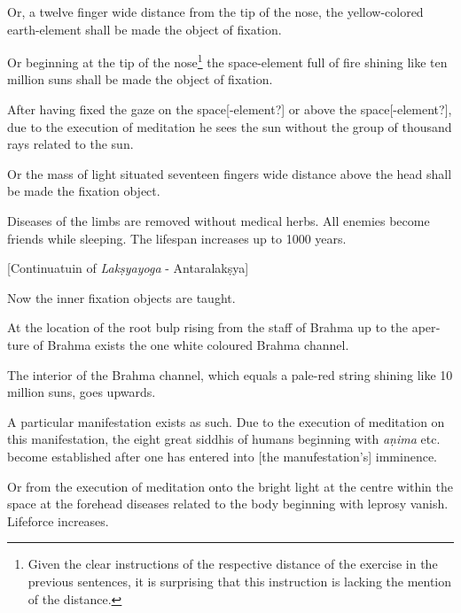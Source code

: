 \begin{otherlanguage}{english}
\begin{tlate}
\end{tlate}
\begin{tlate}
Or, a twelve finger wide distance from the tip of the nose, the yellow-colored earth-element shall be made the object of fixation. 
\end{tlate}
\begin{tlate}
Or beginning at the tip of the nose\footnote{Given the clear instructions of the respective distance of the exercise in the previous sentences, it is surprising that this instruction is lacking the mention of the distance.} the space-element full of fire shining like ten million suns shall be made the object of fixation.
\end{tlate}
\begin{tlate}
After having fixed the gaze on the space[-element?] or above the space[-element?], due to the execution of meditation he sees the sun without the group of thousand rays related to the sun. 
\end{tlate}
\begin{tlate}
Or the mass of light situated seventeen fingers wide distance above the head shall be made the fixation object.
\end{tlate}
\begin{tlate}
Diseases of the limbs are removed without medical herbs. All enemies become friends while sleeping. The lifespan increases up to 1000 years. 
\end{tlate}
\begin{tlate}
     \bigskip
        \centerline{\textrm{\small{[Continuatuin of \textit{Lakṣyayoga} - Antaralakṣya]}}}
          \bigskip
Now the inner fixation objects are taught.
\end{tlate}
\begin{tlate}
At the location of the root bulp rising from the staff of Brahma up to the aperture of Brahma exists the one white coloured Brahma channel. 
\end{tlate}
\begin{tlate}
The interior of the Brahma channel, which equals a pale-red string shining like 10 million suns, goes upwards. 
\end{tlate}
\begin{tlate}
A particular manifestation exists as such. Due to the execution of meditation on this manifestation, the eight great siddhis of humans beginning with \textit{aṇima} etc. become established after one has entered into [the manufestation's] imminence. 
\end{tlate}
\begin{tlate}
Or from the execution of meditation onto the bright light at the centre within the space at the forehead diseases related to the body beginning with leprosy vanish. Lifeforce increases.  
\end{tlate}
\end{otherlanguage}

